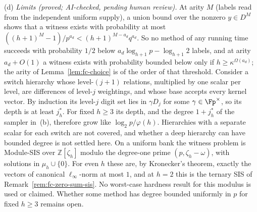 \begin{remark}
\textup{(d)} \emph{Limits (proved; AI-checked, pending human review).} At arity $M$ (labels read from the independent uniform supply), a union bound over the nonzero $y \in D^M$ shows that a witness exists with probability at most $((h+1)^M-1)/p^{a_d} < (h+1)^{M-a_d}q^{a_d}$. So no method of any running time succeeds with probability $1/2$ below $a_d\log_{h+1}p - \log_{h+1}2$ labels, and at arity $a_d + O(1)$ a witness exists with probability bounded below only if $h \ge \kappa^{\Omega(a_d)}$; the arity of Lemma~\ref{lem:fc-choice} is of the order of that threshold. Consider a switch hierarchy whose level-$(j+1)$ relations, multiplied by one scalar per level, are differences of level-$j$ weightings, and whose base accepts every kernel vector. By induction its level-$j$ digit set lies in $\gamma D_j$ for some $\gamma \in \Fp^\times$, so its depth is at least $j^*_h$. For fixed $h \ge 3$ its depth, and the degree $1 + j^*_h$ of the sampler in~(b), therefore grow like $\log_2p/\varphi(h)$. Hierarchies with a separate scalar for each switch are not covered, and whether a deep hierarchy can have bounded degree is not settled here. On a uniform bank the witness problem is Module-SIS over $\mathbb{Z}[\zeta_h]$ modulo the degree-one prime $(p,\zeta_h-\omega)$, with solutions in $\mu_h\cup\{0\}$. For even $h$ these are, by Kronecker's theorem, exactly the vectors of canonical $\ell_\infty$-norm at most $1$, and at $h = 2$ this is the ternary SIS of Remark~\ref{rem:fc-zero-sum-sis}. No worst-case hardness result for this modulus is used or claimed. Whether some method has degree bounded uniformly in $p$ for fixed $h \ge 3$ remains open.
\end{remark}
